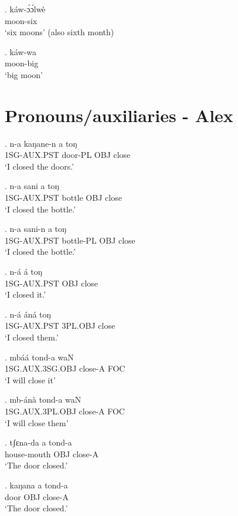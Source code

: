 \documentclass{assets/fieldnotes}
\begin{document}
\exg. káw-ɔ́ɔ́lwè\\
moon-six\\
`six moons' (also sixth month)

\exg. káw-wa \\
moon-big \\
`big moon'

\section{Pronouns/auxiliaries - Alex}


\exg.
n-a    kaŋane-n   a     toŋ   \\
1SG-AUX.PST  door-PL    OBJ   close \\%
`I closed the doors.'

\exg.
n-a    sani     a     toŋ   \\
1SG-AUX.PST  bottle   OBJ   close \\%
`I closed the bottle.'

\exg.
n-a    sani-n      a     toŋ   \\
1SG-AUX.PST bottle-PL   OBJ   close \\%
`I closed the bottle.'

\exg.
n-á   á   toŋ \\
1SG-AUX.PST OBJ close \\%
`I closed it.'

\exg.
n-á    áná       toŋ   \\
1SG-AUX.PST 3PL.OBJ   close \\%
`I closed them.'

\exg.
mbáá              tond-a    waN \\
1SG.AUX.3SG.OBJ   close-A   FOC \\%
`I will close it'

\exg.
mb-ánà            tond-a    waN \\
1SG.AUX.3PL.OBJ   close-A   FOC \\%
`I will close them'


\exg.
tʃɛna-da      a     tond-a  \\
house-mouth   OBJ   close-A \\%
`The door closed.'

\exg.
kaŋana   a     tond-a  \\
door     OBJ   close-A \\%
`The door closed.' \label{The door closed}

\end{document}
